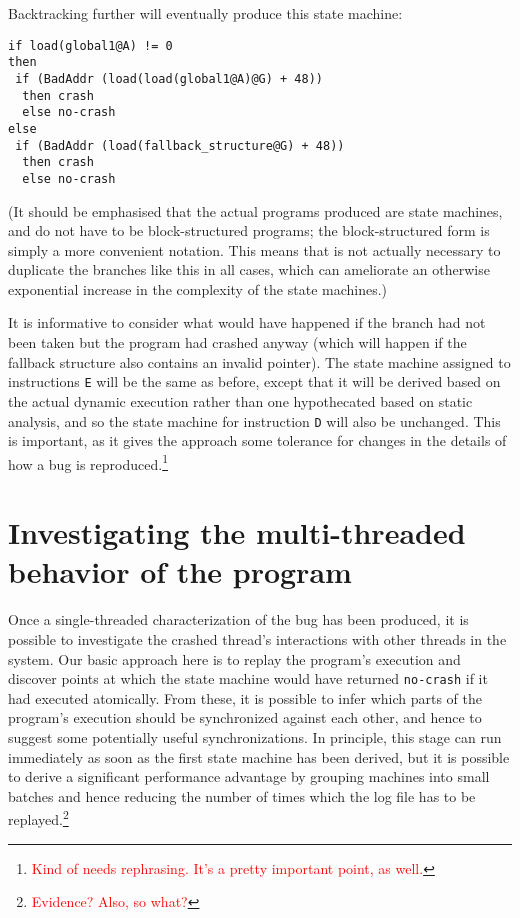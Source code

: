 \documentclass[10pt,twocolumn,preprint,natbib,authoryear]{sigplanconf}
\newcommand{\editorial}[1]{\textcolor{red}{\footnote{\textcolor{red}{#1}}}}
\begin{document}
Backtracking further will eventually produce this state machine:

\begin{verbatim}
if load(global1@A) != 0
then
 if (BadAddr (load(load(global1@A)@G) + 48))
  then crash
  else no-crash
else
 if (BadAddr (load(fallback_structure@G) + 48))
  then crash
  else no-crash
\end{verbatim}

(It should be emphasised that the actual programs produced are state
machines, and do not have to be block-structured programs; the
block-structured form is simply a more convenient notation.  This
means that is not actually necessary to duplicate the branches like
this in all cases, which can ameliorate an otherwise exponential
increase in the complexity of the state machines.)

It is informative to consider what would have happened if the branch
had not been taken but the program had crashed anyway (which will
happen if the fallback structure also contains an invalid pointer).
The state machine assigned to instructions \verb|E| will be the same
as before, except that it will be derived based on the actual dynamic
execution rather than one hypothecated based on static analysis, and
so the state machine for instruction \verb|D| will also be unchanged.
This is important, as it gives the approach some tolerance for changes
in the details of how a bug is reproduced.\editorial{Kind of needs
  rephrasing.  It's a pretty important point, as well.}

\section{Investigating the multi-threaded behavior of the program}

Once a single-threaded characterization of the bug has been produced,
it is possible to investigate the crashed thread's interactions with
other threads in the system.  Our basic approach here is to replay the
program's execution and discover points at which the state machine
would have returned \verb|no-crash| if it had executed atomically.
From these, it is possible to infer which parts of the program's
execution should be synchronized against each other, and hence to
suggest some potentially useful synchronizations.  In principle, this
stage can run immediately as soon as the first state machine has been
derived, but it is possible to derive a significant performance
advantage by grouping machines into small batches and hence reducing
the number of times which the log file has to be
replayed.\editorial{Evidence?  Also, so what?}
\end{document}
